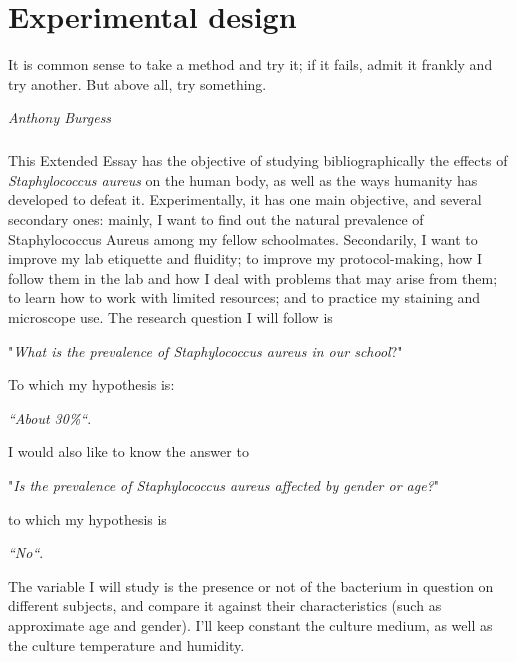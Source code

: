 \chapter{Experimental design}
\epigraph{It is common sense to take a method and try it; if it fails, admit it frankly and try another. But above all, try something.}{\textit{Anthony Burgess}}
\paragraph{}This Extended Essay has the objective of studying bibliographically the effects of \emph{Staphylococcus aureus} on the human body, as well as the ways humanity has developed to defeat it. Experimentally, it has one main objective, and several secondary ones: mainly, I want to find out the natural prevalence of Staphylococcus Aureus among my fellow schoolmates. Secondarily, I want to improve my lab etiquette and fluidity; to improve my protocol-making, how I follow them in the lab and how I deal with problems that may arise from them; to learn how to work with limited resources; and to practice my staining and microscope use. The research question I will follow is 
\begin{center}"\emph{What is the prevalence of \emph{Staphylococcus aureus} in our school}?"\end{center}
To which my hypothesis is:
\begin{center}\emph{``About 30\%``}.\end{center} I would also like to know the answer to
\begin{center}"\emph{Is the prevalence of \emph{Staphylococcus aureus} affected by gender or age?}"\end{center}
to which my hypothesis is 
\begin{center}\emph{``No``}.\end{center}
The variable I will study is the presence or not of the bacterium in question on different subjects, and compare it against their characteristics (such as approximate age and gender). I'll keep constant the culture medium, as well as the culture temperature and humidity.
